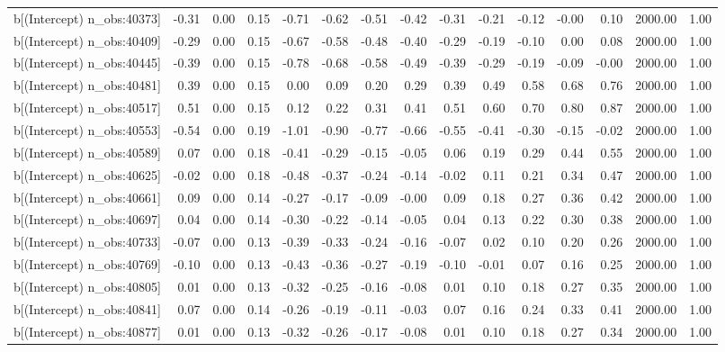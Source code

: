 \begin{table}[ht]
\begin{tabular}{rrrrrrrrrrrrrrr}
  b[(Intercept) n\_obs:40373] & -0.31 & 0.00 & 0.15 & -0.71 & -0.62 & -0.51 & -0.42 & -0.31 & -0.21 & -0.12 & -0.00 & 0.10 & 2000.00 & 1.00 \\ 
  b[(Intercept) n\_obs:40409] & -0.29 & 0.00 & 0.15 & -0.67 & -0.58 & -0.48 & -0.40 & -0.29 & -0.19 & -0.10 & 0.00 & 0.08 & 2000.00 & 1.00 \\ 
  b[(Intercept) n\_obs:40445] & -0.39 & 0.00 & 0.15 & -0.78 & -0.68 & -0.58 & -0.49 & -0.39 & -0.29 & -0.19 & -0.09 & -0.00 & 2000.00 & 1.00 \\ 
  b[(Intercept) n\_obs:40481] & 0.39 & 0.00 & 0.15 & 0.00 & 0.09 & 0.20 & 0.29 & 0.39 & 0.49 & 0.58 & 0.68 & 0.76 & 2000.00 & 1.00 \\ 
  b[(Intercept) n\_obs:40517] & 0.51 & 0.00 & 0.15 & 0.12 & 0.22 & 0.31 & 0.41 & 0.51 & 0.60 & 0.70 & 0.80 & 0.87 & 2000.00 & 1.00 \\ 
  b[(Intercept) n\_obs:40553] & -0.54 & 0.00 & 0.19 & -1.01 & -0.90 & -0.77 & -0.66 & -0.55 & -0.41 & -0.30 & -0.15 & -0.02 & 2000.00 & 1.00 \\ 
  b[(Intercept) n\_obs:40589] & 0.07 & 0.00 & 0.18 & -0.41 & -0.29 & -0.15 & -0.05 & 0.06 & 0.19 & 0.29 & 0.44 & 0.55 & 2000.00 & 1.00 \\ 
  b[(Intercept) n\_obs:40625] & -0.02 & 0.00 & 0.18 & -0.48 & -0.37 & -0.24 & -0.14 & -0.02 & 0.11 & 0.21 & 0.34 & 0.47 & 2000.00 & 1.00 \\ 
  b[(Intercept) n\_obs:40661] & 0.09 & 0.00 & 0.14 & -0.27 & -0.17 & -0.09 & -0.00 & 0.09 & 0.18 & 0.27 & 0.36 & 0.42 & 2000.00 & 1.00 \\ 
  b[(Intercept) n\_obs:40697] & 0.04 & 0.00 & 0.14 & -0.30 & -0.22 & -0.14 & -0.05 & 0.04 & 0.13 & 0.22 & 0.30 & 0.38 & 2000.00 & 1.00 \\ 
  b[(Intercept) n\_obs:40733] & -0.07 & 0.00 & 0.13 & -0.39 & -0.33 & -0.24 & -0.16 & -0.07 & 0.02 & 0.10 & 0.20 & 0.26 & 2000.00 & 1.00 \\ 
  b[(Intercept) n\_obs:40769] & -0.10 & 0.00 & 0.13 & -0.43 & -0.36 & -0.27 & -0.19 & -0.10 & -0.01 & 0.07 & 0.16 & 0.25 & 2000.00 & 1.00 \\ 
  b[(Intercept) n\_obs:40805] & 0.01 & 0.00 & 0.13 & -0.32 & -0.25 & -0.16 & -0.08 & 0.01 & 0.10 & 0.18 & 0.27 & 0.35 & 2000.00 & 1.00 \\ 
  b[(Intercept) n\_obs:40841] & 0.07 & 0.00 & 0.14 & -0.26 & -0.19 & -0.11 & -0.03 & 0.07 & 0.16 & 0.24 & 0.33 & 0.41 & 2000.00 & 1.00 \\ 
  b[(Intercept) n\_obs:40877] & 0.01 & 0.00 & 0.13 & -0.32 & -0.26 & -0.17 & -0.08 & 0.01 & 0.10 & 0.18 & 0.27 & 0.34 & 2000.00 & 1.00 \\ 

\end{tabular}
\end{table}
